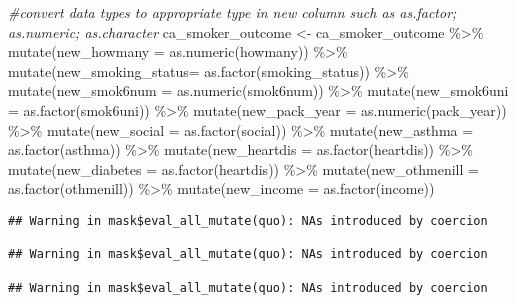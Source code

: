 \documentclass[
]{article}
\newenvironment{Shaded}{\begin{snugshade}}{\end{snugshade}}
\newcommand{\AttributeTok}[1]{\textcolor[rgb]{0.77,0.63,0.00}{#1}}
\newcommand{\CommentTok}[1]{\textcolor[rgb]{0.56,0.35,0.01}{\textit{#1}}}
\newcommand{\FunctionTok}[1]{\textcolor[rgb]{0.00,0.00,0.00}{#1}}
\newcommand{\NormalTok}[1]{#1}
\newcommand{\OtherTok}[1]{\textcolor[rgb]{0.56,0.35,0.01}{#1}}
\newcommand{\SpecialCharTok}[1]{\textcolor[rgb]{0.00,0.00,0.00}{#1}}
\begin{document}
\begin{Shaded}
\begin{Highlighting}[]
\CommentTok{\#convert data types to appropriate type in new column such as as.factor; as.numeric; as.character}
\NormalTok{ca\_smoker\_outcome }\OtherTok{\textless{}{-}}\NormalTok{ ca\_smoker\_outcome }\SpecialCharTok{\%\textgreater{}\%} \FunctionTok{mutate}\NormalTok{(}\AttributeTok{new\_howmany =} \FunctionTok{as.numeric}\NormalTok{(howmany)) }\SpecialCharTok{\%\textgreater{}\%}
  \FunctionTok{mutate}\NormalTok{(}\AttributeTok{new\_smoking\_status=} \FunctionTok{as.factor}\NormalTok{(smoking\_status)) }\SpecialCharTok{\%\textgreater{}\%} 
  \FunctionTok{mutate}\NormalTok{(}\AttributeTok{new\_smok6num =} \FunctionTok{as.numeric}\NormalTok{(smok6num)) }\SpecialCharTok{\%\textgreater{}\%} 
  \FunctionTok{mutate}\NormalTok{(}\AttributeTok{new\_smok6uni =} \FunctionTok{as.factor}\NormalTok{(smok6uni)) }\SpecialCharTok{\%\textgreater{}\%}
  \FunctionTok{mutate}\NormalTok{(}\AttributeTok{new\_pack\_year =} \FunctionTok{as.numeric}\NormalTok{(pack\_year)) }\SpecialCharTok{\%\textgreater{}\%} 
  \FunctionTok{mutate}\NormalTok{(}\AttributeTok{new\_social =} \FunctionTok{as.factor}\NormalTok{(social)) }\SpecialCharTok{\%\textgreater{}\%} 
  \FunctionTok{mutate}\NormalTok{(}\AttributeTok{new\_asthma =} \FunctionTok{as.factor}\NormalTok{(asthma)) }\SpecialCharTok{\%\textgreater{}\%} 
  \FunctionTok{mutate}\NormalTok{(}\AttributeTok{new\_heartdis =} \FunctionTok{as.factor}\NormalTok{(heartdis)) }\SpecialCharTok{\%\textgreater{}\%} 
  \FunctionTok{mutate}\NormalTok{(}\AttributeTok{new\_diabetes =} \FunctionTok{as.factor}\NormalTok{(heartdis)) }\SpecialCharTok{\%\textgreater{}\%} 
  \FunctionTok{mutate}\NormalTok{(}\AttributeTok{new\_othmenill =} \FunctionTok{as.factor}\NormalTok{(othmenill)) }\SpecialCharTok{\%\textgreater{}\%} 
  \FunctionTok{mutate}\NormalTok{(}\AttributeTok{new\_income =} \FunctionTok{as.factor}\NormalTok{(income))}
\end{Highlighting}
\end{Shaded}

\begin{verbatim}
## Warning in mask$eval_all_mutate(quo): NAs introduced by coercion

## Warning in mask$eval_all_mutate(quo): NAs introduced by coercion

## Warning in mask$eval_all_mutate(quo): NAs introduced by coercion
\end{verbatim}

\begin{Shaded}
\end{Shaded}
\end{document}
